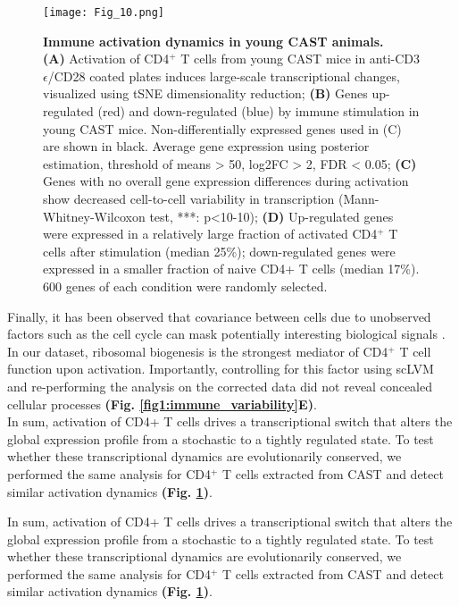 \begin{figure}[!ht]
\centering
\texttt{[image: Fig\_10.png]}
\caption[Immune activation dynamics in young CAST animals]{\textbf{Immune activation dynamics in young CAST animals.}\\
\textbf{(A)} Activation of CD4$^+$ T cells from young CAST mice in anti-CD3$\epsilon$/CD28 coated plates induces large-scale transcriptional changes, visualized using tSNE dimensionality reduction; \textbf{(B)} Genes up-regulated (red) and down-regulated (blue) by immune stimulation in young CAST mice. Non-differentially expressed genes used in (C) are shown  in black. Average gene expression using posterior estimation, threshold of means > 50, log2FC > 2, FDR < 0.05; \textbf{(C)} Genes with no overall gene expression differences during activation show decreased cell-to-cell variability in transcription (Mann-Whitney-Wilcoxon test, ***: p<10-10); \textbf{(D)} Up-regulated genes were expressed in a relatively large fraction of activated CD4$^+$ T cells after stimulation (median 25\%); down-regulated genes were expressed in a smaller fraction of naive CD4+ T cells (median 17\%). 600 genes of each condition were randomly selected.
}
\label{fig1:immune_activation_CAST}
\end{figure}

Finally, it has been observed that covariance between cells due to unobserved factors such as the cell cycle can mask potentially interesting biological signals \citep{Stegle2015}. In our dataset, ribosomal biogenesis is the strongest mediator of CD4$^+$ T cell function upon activation. Importantly, controlling for this factor using scLVM \citep{Buettner2015} and re-performing the analysis on the corrected data did not reveal concealed cellular processes \textbf{(Fig. \ref{fig1:immune_variability}E)}.\\

In sum, activation of CD4+ T cells drives a transcriptional switch that alters the global expression profile from a stochastic to a tightly regulated state. To test whether these transcriptional dynamics are evolutionarily conserved, we performed the same analysis for CD4$^+$ T cells extracted from CAST and detect similar activation dynamics \textbf{(Fig. \ref{fig1:immune_activation_CAST})}.



In sum, activation of CD4+ T cells drives a transcriptional switch that alters the global expression profile from a stochastic to a tightly regulated state. To test whether these transcriptional dynamics are evolutionarily conserved, we performed the same analysis for CD4$^+$ T cells extracted from CAST and detect similar activation dynamics \textbf{(Fig. \ref{fig1:immune_activation_CAST})}.

